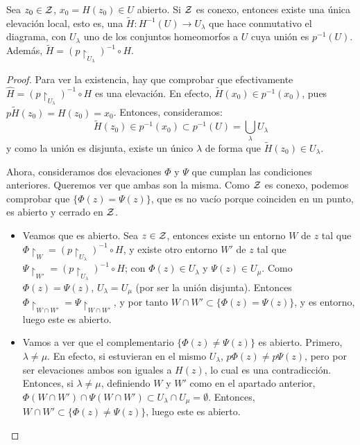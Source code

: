 \begin{lem}
	\label{grf_lema_elevacion_local}
	Sea $z_0\in\mathcal{Z}$, $x_0=H(z_0)\in U$ abierto. Si $\mathcal{Z}$ es conexo, entonces existe una única elevación local, esto es, una $\widetilde{H}:H^{-1}(U)\to U_\lambda$ que hace conmutativo el diagrama, con $U_\lambda$ uno de los conjuntos homeomorfos a $U$ cuya unión es $p^{-1}(U)$. Además, $\widetilde{H}=(p\restriction_{U_\lambda})^{-1}\circ H$.
	
	\begin{proof}
		Para ver la existencia, hay que comprobar que efectivamente $\widehat{H}=(p\restriction_{U_\lambda})^{-1}\circ H$ es una elevación. En efecto, $\widetilde{H}(x_0)\in p^{-1}(x_0)$, pues $p\widetilde{H}(z_0)=H(z_0)=x_0$. Entonces, consideramos:
		\[\widetilde{H}(z_0)\in p^{-1}(x_0)\subset p^{-1}(U)=\bigcup_\lambda U_\lambda\]
		y como la unión es disjunta, existe un único $\lambda$ de forma que $\widetilde{H}(z_0)\in U_\lambda$.
		
		Ahora, consideramos dos elevaciones $\Phi$ y $\Psi$ que cumplan las condiciones anteriores. Queremos ver que ambas son la misma. Como $\mathcal{Z}$ es conexo, podemos comprobar que $\{\Phi(z)=\Psi(z)\}$, que es no vacío porque coinciden en un punto, es abierto y cerrado en $\mathcal{Z}$.
		
		\begin{itemize}
			\item Veamos que es abierto. Sea $z\in\mathcal{Z}$, entonces existe un entorno $W$ de $z$ tal que $\Phi\restriction_{W}=(p\restriction_{U_\lambda})^{-1}\circ H$, y existe otro entorno $W'$ de $z$ tal que $\Psi\restriction_{W'}=(p\restriction_{U_\lambda})^{-1}\circ H$; con $\Phi(z)\in U_\lambda$ y $\Psi(z)\in U_\mu$. Como $\Phi(z)=\Psi(z)$, $U_\lambda = U_\mu$ (por ser la unión disjunta). Entonces $\Phi\restriction_{W\cap W'}=\Psi\restriction_{W\cap W'}$, y por tanto $W\cap W'\subset\{\Phi(z)=\Psi(z)\}$, y es entorno, luego este es abierto.
			
			\item Vamos a ver que el complementario $\{\Phi(z)\neq\Psi(z)\}$ es abierto. Primero, $\lambda\neq\mu$. En efecto, si estuvieran en el mismo $U_\lambda$, $p\Phi(z)\neq p\Psi(z)$, pero por ser elevaciones ambos son iguales a $H(z)$, lo cual es una contradicción. Entonces, si $\lambda\neq\mu$, definiendo $W$ y $W'$ como en el apartado anterior, $\Phi(W\cap W')\cap \Psi(W\cap W')\subset U_\lambda\cap U_\mu=\emptyset$. Entonces, $W\cap W'\subset \{\Phi(z)\neq\Psi(z)\}$, luego este es abierto. \qedhere
		\end{itemize}
	\end{proof}
\end{lem}

